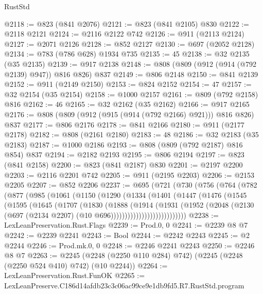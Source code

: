\begin{lexlean}{RustStd}
\begin{coremodule}
@2118 := @823 (@841 @2076)
@2121 := @823 (@841 @2105) @830
@2122 := @2118 @2121
@2124 := @2116 @2122 @742
@2126 := @911 (@2113 @2124)
@2127 := @2071 @2126
@2128 := @852 @2127
@2130 := @697 (@2052 @2128)
@2134 := @783 (@786 @628) @1934 @735
@2135 := 45
@2138 := @32 @2135 (@35 @2135)
@2139 := @917 @2138
@2148 := @808 (@809 (@912 (@914 (@792 @2139) @947)) @816 @826) @837
@2149 := @806 @2148
@2150 := @841 @2139
@2152 := @911 (@2149 @2150)
@2153 := @824 @2152
@2154 := 47
@2157 := @32 @2154 (@35 @2154)
@2158 := @1000 @2157
@2161 := @809 (@792 @2158) @816
@2162 := 46
@2165 := @32 @2162 (@35 @2162)
@2166 := @917 @2165
@2176 := @808 (@809 (@912 (@915 (@914 (@792 @2166) @921))) @816 @826) @837
@2177 := @806 @2176
@2178 := @841 @2166
@2180 := @911 (@2177 @2178)
@2182 := @808 (@2161 @2180)
@2183 := 48
@2186 := @32 @2183 (@35 @2183)
@2187 := @1000 @2186
@2193 := @808 (@809 (@792 @2187) @816 @854) @837
@2194 := @2182 @2193
@2195 := @806 @2194
@2197 := @823 (@841 @2158)
@2200 := @823 (@841 @2187) @830
@2201 := @2197 @2200
@2203 := @2116 @2201 @742
@2205 := @911 (@2195 @2203)
@2206 := @2153 @2205
@2207 := @852 @2206
@2237 := @695
    (@721
      (@730
        (@756
          (@764
            (@782
              (@877
                (@985
                  (@1061
                    (@1150
                      (@1290
                        (@1334
                          (@1401
                            (@1447
                              (@1476
                                (@1545
                                  (@1595
                                    (@1645
                                      (@1707
                                        (@1830
                                          (@1888
                                            (@1914
                                              (@1931
                                                (@1952
                                                  (@2048
                                                    (@2130
                                                      (@697
                                                        (@2134 @2207)
                                                        (@10 @696)))))))))))))))))))))))))))
@2238 := LexLeanPreservation.Rust.Flags
@2239 := Prod.{0, 0}
@2241 := @2239 @8 @7
@2242 := @2239 @2241
@2243 := Bool
@2244 := @2242 @2243
@2245 := @2 @2244
@2246 := Prod.mk.{0, 0}
@2248 := @2246 @2241 @2243
@2250 := @2246 @8 @7
@2263 := @2245 (@2248 (@2250 @110 @284) @742) (@2245 (@2248 (@2250 @524 @410) @742) (@10 @2244))
@2264 := LexLeanPreservation.Rust.FunOK
@2265 := LexLeanPreserve.C186d14afdb23c3c06ac99ce9e1db9fd5.R7.RustStd.program

\end{coremodule}
\end{lexlean}
